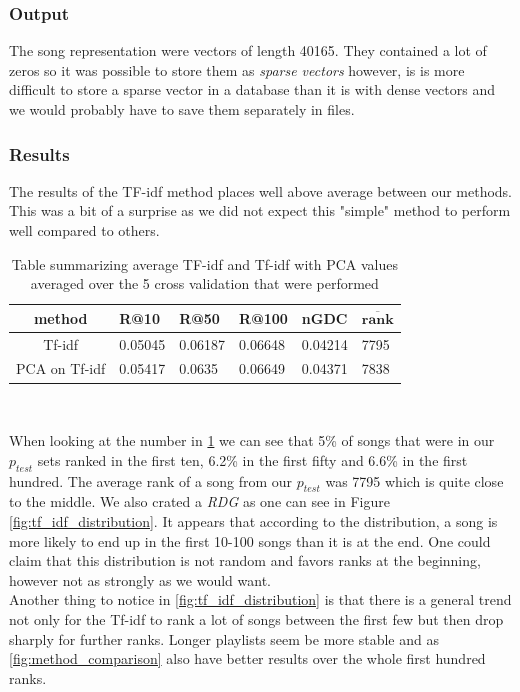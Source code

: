 \subsubsection{Output}
The song representation were vectors of length 40165. They contained a lot of zeros so it was possible to store them as \textit{sparse vectors} however, is is more difficult to store a sparse vector in a database than it is with dense vectors and we would probably have to save them separately in files.

\subsubsection{Results}

The results of the TF-idf method places well above average between our methods. This was a bit of a surprise as we did not expect this "simple" method to perform well compared to others. \\

\begin{table}[h]
\centering
\renewcommand{\arraystretch}{1.5}
\begin{tabu} to 1\textwidth {| c || X[c] | X[c] | X[c] | X[c] | X[c] | }
 \hline
 \textbf{method} & \textbf{R@10} & \textbf{R@50} & \textbf{R@100} & \textbf{nGDC} & $ \boldsymbol{\overline{rank}} $ \\
 \hline
 \hline
 Tf-idf & 0.05045 & 0.06187 & 0.06648 & 0.04214 & 7795 \\
 \hline
 PCA on Tf-idf & 0.05417 & 0.0635 & 0.06649 & 0.04371 & 7838 \\
 \hline
\end{tabu} \\
\caption{Table summarizing average TF-idf and Tf-idf with PCA values averaged over the 5 cross validation that were performed}
\label{table:1}
\end{table}

When looking at the number in \ref{table:1} we can see that 5\% of songs that were in our $p_{test}$ sets ranked in the first ten, 6.2\% in the first fifty and 6.6\% in the first hundred. The average rank of a song from our $p_{test}$ was 7795 which is quite close to the middle. We also crated a \textit{RDG} as one can see in Figure \ref{fig:tf_idf_distribution}. It appears that according to the distribution, a song is more likely to end up in the first 10-100 songs than it is at the end. One could claim that this distribution is not random and favors ranks at the beginning, however not as strongly as we would want.\\
Another thing to notice in \ref{fig:tf_idf_distribution} is that there is a general trend not only for the Tf-idf to rank a lot of songs between the first few but then drop sharply for further ranks. Longer playlists seem be more stable and as \ref{fig:method_comparison} also have better results over the whole first hundred ranks.

